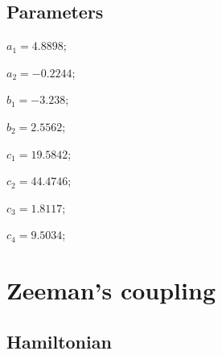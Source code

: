 \documentclass[aps,amssymb,onecolumn]{revtex4}
\begin{document}
\subsection{Parameters}

\noindent $ a_{1} = 4.8898 $;

\noindent $ a_{2} = -0.2244 $;

\noindent $ b_{1} = -3.238 $;

\noindent $ b_{2} = 2.5562 $;

\noindent $ c_{1} = 19.5842 $;

\noindent $ c_{2} = 44.4746 $;

\noindent $ c_{3} = 1.8117 $;

\noindent $ c_{4} = 9.5034 $;

\section{Zeeman's coupling}

\subsection{Hamiltonian}
\end{document}
